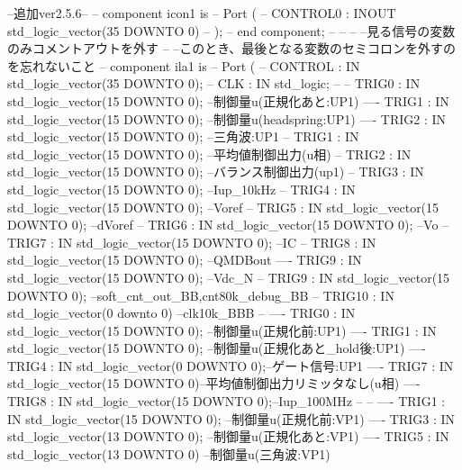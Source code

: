 \begin{mylisting}[language=VHDL,caption=ゲート信号出力モジュール,label=MMC_PWM_GEN_module_VHDL]
	--追加ver2.5.6--
--		component icon1 is
--			Port (
--			  CONTROL0                          :   INOUT   std_logic_vector(35 DOWNTO 0)
--			);
--		end component;
--
--
--	--見る信号の変数のみコメントアウトを外す
--	--このとき、最後となる変数のセミコロンを外すのを忘れないこと
--		component ila1 is
--			Port (
--			  CONTROL                           :   IN   std_logic_vector(35 DOWNTO 0);
--			  CLK		                           :   IN   std_logic;
--			  
--			  TRIG0	                           :   IN   std_logic_vector(15 DOWNTO 0); --制御量u(正規化あと:UP1)
----			  TRIG1	                           : 	 IN   std_logic_vector(15 DOWNTO 0); --制御量u(headspring:UP1)
----			  TRIG2	                           : 	 IN   std_logic_vector(15 DOWNTO 0); --三角波:UP1			  
--			  TRIG1	                           : 	 IN   std_logic_vector(15 DOWNTO 0); --平均値制御出力(u相)
--			  TRIG2	                           : 	 IN   std_logic_vector(15 DOWNTO 0); --バランス制御出力(up1)
--			  TRIG3	                           : 	 IN   std_logic_vector(15 DOWNTO 0); --Iup_10kHz			  
--			  TRIG4	                           : 	 IN   std_logic_vector(15 DOWNTO 0); --Voref
--			  TRIG5	                           : 	 IN   std_logic_vector(15 DOWNTO 0); --dVoref
--			  TRIG6	                           : 	 IN   std_logic_vector(15 DOWNTO 0); --Vo              
--			  TRIG7	                           : 	 IN   std_logic_vector(15 DOWNTO 0); --IC
--			  TRIG8	                   		   : 	 IN   std_logic_vector(15 DOWNTO 0); --QMDBout
----			  TRIG9	                   		   : 	 IN   std_logic_vector(15 DOWNTO 0); --Vdc_N
--			  TRIG9	                   		   : 	 IN   std_logic_vector(15 DOWNTO 0); --soft_cnt_out_BB,cnt80k_debug_BB
--			  TRIG10	                   		   : 	 IN   std_logic_vector(0 downto 0) --clk10k_BBB
--			  
----			  TRIG0	                           :   IN   std_logic_vector(15 DOWNTO 0); --制御量u(正規化前:UP1)
----			  TRIG1	                           :   IN   std_logic_vector(15 DOWNTO 0); --制御量u(正規化あと_hold後:UP1)
----			  TRIG4	                           : 	 IN   std_logic_vector(0 DOWNTO 0);--ゲート信号:UP1
----			  TRIG7	                           : 	 IN   std_logic_vector(15 DOWNTO 0)--平均値制御出力リミッタなし(u相)
----			  TRIG8	                           : 	 IN   std_logic_vector(15 DOWNTO 0);--Iup_100MHz
--
--
----			  TRIG1									   :   IN   std_logic_vector(15 DOWNTO 0); --制御量u(正規化前:VP1)
----			  TRIG3	                           :   IN   std_logic_vector(13 DOWNTO 0); --制御量u(正規化あと:VP1)			  
----			  TRIG5	                           : 	 IN   std_logic_vector(13 DOWNTO 0)  --制御量u(三角波:VP1)

\end{mylisting}
